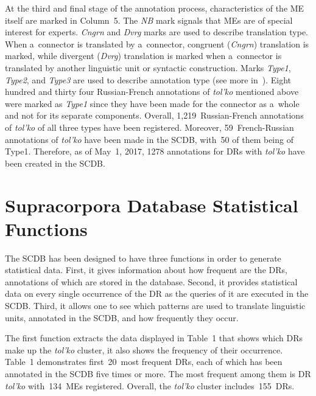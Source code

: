 \begin{multicols}{2}
  At the third and final stage of the annotation process, characteristics of the ME 
itself are marked in Column~5. The \textit{NB} mark signals that MEs are of 
special interest for experts. \textit{Cngrn} and \textit{Dvrg} marks are used to 
describe translation type. When a~connector is translated by a~connector, congruent 
(\textit{Cngrn}) translation is marked, while divergent (\textit{Dvrg}) translation is 
marked when a~connector is translated by another linguistic unit or syntactic 
construction. Marks \textit{Type1}, \textit{Type2}, and \textit{Type3} are used 
to describe annotation type (see more in~\cite{9-in, 10-in, 15-in}). 
Eight hundred and thirty four Russian-French annotations of \textit{tol'ko} 
mentioned above were marked as 
\textit{Type1} since they have been made for the connector as a~whole and not for 
its separate components. Overall, 1,219~Russian-French annotations of 
\textit{tol'ko} of all three types have been registered. Moreover, 
59~French-Russian  annotations of \textit{tol'ko} have been made in the SCDB, with~50 of 
them being of Type1. Therefore, as of May~1, 2017, 1278 annotations for DRs 
with \textit{tol'ko} have been created in the SCDB.
{

}

  
\section{Supracorpora Database Statistical Functions}

  \noindent
  The SCDB has been designed to have three functions in order to generate 
statistical data. First, it gives information about how frequent are the DRs, 
annotations of which are stored in the database. Second, it provides statistical data 
on every single occurrence of the DR as the queries of it are executed in the SCDB. 
Third, it allows one to see which patterns are used to translate linguistic units, 
annotated in the SCDB, and how frequently they occur.
  
  The first function extracts the data displayed in Table~1 that shows which DRs 
make up the \textit{tol'ko} cluster, it also shows the frequency of their occurrence. 
Table~1 demonstrates first~20~most frequent DRs, each of which has been 
annotated in the SCDB five times or more. The most frequent among them is DR 
\textit{tol'ko} with~134~MEs registered. Overall, the \textit{tol'ko} cluster 
includes~155~DRs.
  


\end{multicols}
